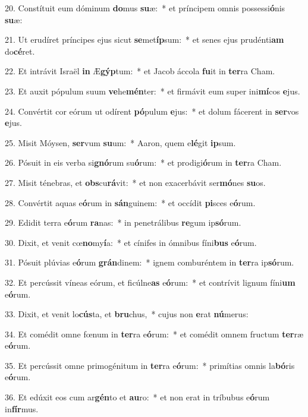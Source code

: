 20. Constítuit eum dóminum \textbf{do}mus \textbf{su}æ:~*  et príncipem omnis possessi\textbf{ó}nis \textbf{su}æ:\

21. Ut erudíret príncipes ejus sicut \textbf{se}met\textbf{íp}sum:~*  et senes ejus prudénti\textbf{am} do\textbf{cé}ret.\

22. Et intrávit Israël \textbf{in} Æ\textbf{gýp}tum:~*  et Jacob áccola \textbf{fu}it in \textbf{ter}ra Cham.\

23. Et auxit pópulum suum \textbf{ve}he\textbf{mén}ter:~*  et firmávit eum super ini\textbf{mí}cos \textbf{e}jus.\

24. Convértit cor eórum ut odírent \textbf{pó}pulum \textbf{e}jus:~*  et dolum fácerent in \textbf{ser}vos \textbf{e}jus.\

25. Misit Móysen, \textbf{ser}vum \textbf{su}um:~*  Aaron, quem e\textbf{lé}git \textbf{ip}sum.\

26. Pósuit in eis verba si\textbf{gnó}rum su\textbf{ó}rum:~*  et prodigi\textbf{ó}rum in \textbf{ter}ra Cham.\

27. Misit ténebras, et \textbf{obs}cu\textbf{rá}vit:~*  et non exacerbávit ser\textbf{mó}nes \textbf{su}os.\

28. Convértit aquas e\textbf{ó}rum in \textbf{sán}guinem:~*  et occídit \textbf{pi}sces e\textbf{ó}rum.\

29. Edidit terra e\textbf{ó}rum \textbf{ra}nas:~*  in penetrálibus \textbf{re}gum ip\textbf{só}rum.\

30. Dixit, et venit cœ\textbf{no}my\textbf{í}a:~*  et cínifes in ómnibus fíni\textbf{bus} e\textbf{ó}rum.\

31. Pósuit plúvias e\textbf{ó}rum \textbf{grán}dinem:~*  ignem comburéntem in \textbf{ter}ra ip\textbf{só}rum.\

32. Et percússit víneas eórum, et ficúlne\textbf{as} e\textbf{ó}rum:~*  et contrívit lignum fíni\textbf{um} e\textbf{ó}rum.\

33. Dixit, et venit lo\textbf{cús}ta, et \textbf{bru}chus,~*  cujus non \textbf{e}rat \textbf{nú}merus:\

34. Et comédit omne fœnum in \textbf{ter}ra e\textbf{ó}rum:~*  et comédit omnem fructum \textbf{ter}ræ e\textbf{ó}rum.\

35. Et percússit omne primogénitum in \textbf{ter}ra e\textbf{ó}rum:~*  primítias omnis la\textbf{bó}ris e\textbf{ó}rum.\

36. Et edúxit eos cum ar\textbf{gén}to et \textbf{au}ro:~*  et non erat in tríbubus e\textbf{ó}rum in\textbf{fír}mus.\

